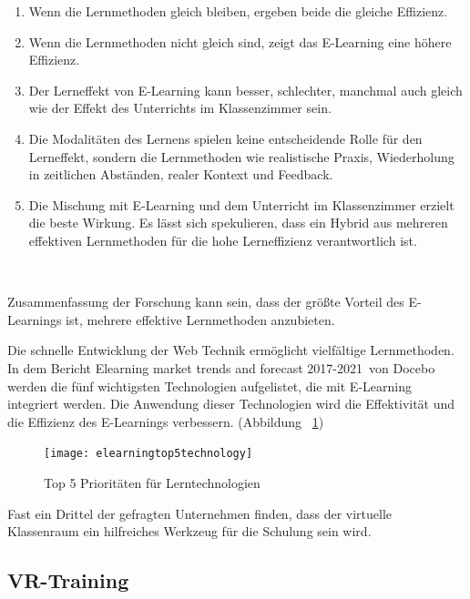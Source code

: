 \begin{enumerate}
\item Wenn die Lernmethoden gleich bleiben, ergeben beide die gleiche Effizienz.
\item Wenn die Lernmethoden nicht gleich sind, zeigt das E-Learning eine höhere Effizienz.
\item Der Lerneffekt von E-Learning kann besser, schlechter, manchmal auch gleich wie der Effekt des Unterrichts im Klassenzimmer sein.
\item Die Modalitäten des Lernens spielen keine entscheidende Rolle für den Lerneffekt, sondern die Lernmethoden wie realistische Praxis, Wiederholung in zeitlichen Abständen, realer Kontext und Feedback.
\item Die Mischung mit E-Learning und dem Unterricht im Klassenzimmer erzielt die beste Wirkung.
Es lässt sich spekulieren, dass ein Hybrid aus mehreren effektiven Lernmethoden für die hohe Lerneffizienz verantwortlich ist.

\end{enumerate}\

Zusammenfassung der Forschung kann sein, dass der größte Vorteil des E-Learnings ist, mehrere effektive Lernmethoden anzubieten.

Die schnelle Entwicklung der Web Technik ermöglicht vielfältige Lernmethoden. In dem Bericht \glqq Elearning market trends and forecast 2017-2021\grqq\ von Docebo werden die fünf wichtigsten Technologien aufgelistet, die mit E-Learning integriert werden. Die Anwendung dieser Technologien wird die Effektivität und die Effizienz des E-Learnings verbessern. (Abbildung ~\ref{fig:elearningtop5technology})

\begin{figure}[ht]
\vspace*{1em}
\centering
\caption{Top 5 Prioritäten für Lerntechnologien}
\texttt{[image: elearningtop5technology]}
\label{fig:elearningtop5technology} 
\end{figure}

Fast ein Drittel der gefragten Unternehmen finden, dass der virtuelle Klassenraum ein hilfreiches Werkzeug für die Schulung sein wird.

 \subsection{VR-Training}
 
